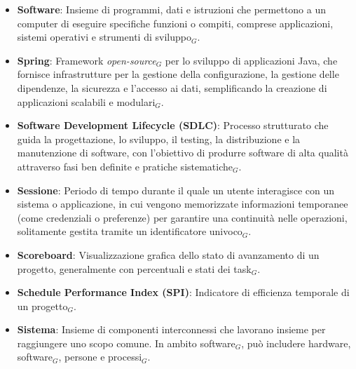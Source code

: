 \begin{itemize}
    \item \textbf{Software}: Insieme di programmi, dati e istruzioni che permettono a un computer di eseguire specifiche funzioni o compiti, comprese applicazioni, sistemi operativi e strumenti di sviluppo$_G$.
    \item \textbf{Spring}: Framework \textit{open-source}$_G$ per lo sviluppo di applicazioni Java, che fornisce infrastrutture per la gestione della configurazione, la gestione delle dipendenze, la sicurezza e l'accesso ai dati, semplificando la creazione di applicazioni scalabili e modulari$_G$.
    \item \textbf{Software Development Lifecycle (SDLC)}: Processo strutturato che guida la progettazione, lo sviluppo, il testing, la distribuzione e la manutenzione di software, con l'obiettivo di produrre software di alta qualità attraverso fasi ben definite e pratiche sistematiche$_G$.
    \item \textbf{Sessione}: Periodo di tempo durante il quale un utente interagisce con un sistema o applicazione, in cui vengono memorizzate informazioni temporanee (come credenziali o preferenze) per garantire una continuità nelle operazioni, solitamente gestita tramite un identificatore univoco$_G$.
    \item \textbf{Scoreboard}: Visualizzazione grafica dello stato di avanzamento di un progetto, generalmente con percentuali e stati dei task$_G$.
    \item \textbf{Schedule Performance Index (SPI)}: Indicatore di efficienza temporale di un progetto$_G$.
    \item \textbf{Sistema}: Insieme di componenti interconnessi che lavorano insieme per raggiungere uno scopo comune. In ambito software$_G$, può includere hardware, software$_G$, persone e processi$_G$.
\end{itemize}
